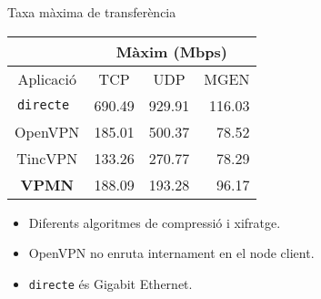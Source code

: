     \begin{frame}{Taxa màxima de transferència}
        \begin{center}
\begin{tabular}{|c|c|c|r|}
\multicolumn{1}{c}{} & \multicolumn{3}{|c|}{Màxim (Mbps)} \\ \hline
Aplicació & TCP & UDP & MGEN \\ \hline \hline
\tt directe & 690.49 & 929.91 & 116.03 \\ \hline
OpenVPN & 185.01 & 500.37 & 78.52 \\ \hline
TincVPN & 133.26 & 270.77 & 78.29 \\ \hline
\bf VPMN & 188.09 & 193.28 & 96.17 \\ \hline
\end{tabular}
        \end{center}
        \begin{itemize}
\item Diferents algoritmes de compressió i xifratge.
\item OpenVPN no enruta internament en el node client.
\item {\tt directe} és Gigabit Ethernet.
        \end{itemize}
    \end{frame}
